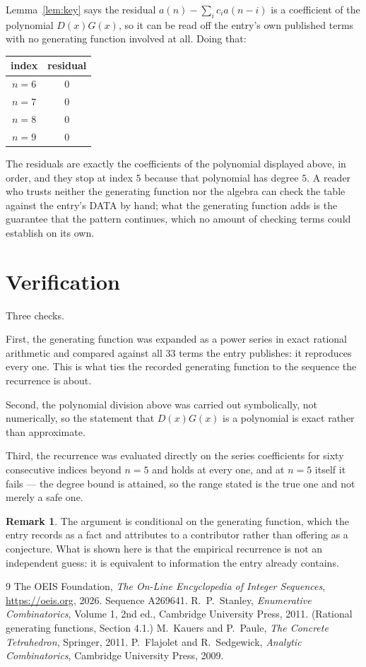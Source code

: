 \documentclass[11pt,a4paper]{article}
\theoremstyle{plain}
\theoremstyle{definition}
\newtheorem{remark}[theorem]{Remark}
\begin{document}
Lemma~\ref{lem:key} says the residual $a(n)-\sum_ic_ia(n-i)$ is a coefficient of the
polynomial $D(x)G(x)$, so it can be read off the entry's own published terms with no
generating function involved at all. Doing that:
\begin{center}
\begin{tabular}{cc}
index & residual \\ \hline
$n=6$ & $0$ \\
$n=7$ & $0$ \\
$n=8$ & $0$ \\
$n=9$ & $0$
\end{tabular}
\end{center}
The residuals are exactly the coefficients of the polynomial displayed above, in order, and
they stop at index $5$ because that polynomial has degree $5$. A reader who trusts
neither the generating function nor the algebra can check the table against the entry's DATA
by hand; what the generating function adds is the guarantee that the pattern continues, which
no amount of checking terms could establish on its own.

\section{Verification}

Three checks.

First, the generating function was expanded as a power series in exact rational arithmetic and
compared against all $33$ terms the entry publishes: it reproduces every one. This is
what ties the recorded generating function to the sequence the recurrence is about.

Second, the polynomial division above was carried out symbolically, not numerically, so the
statement that $D(x)G(x)$ is a polynomial is exact rather than approximate.

Third, the recurrence was evaluated directly on the series coefficients for sixty consecutive
indices beyond $n=5$ and holds at every one, and at $n=5$ itself it fails --- the
degree bound is attained, so the range stated is the true one and not merely a safe one.

\begin{remark}
The argument is conditional on the generating function, which the entry records as a fact and
attributes to a contributor rather than offering as a conjecture. What is shown here is that
the empirical recurrence is not an independent guess: it is equivalent to information the
entry already contains.
\end{remark}

\begin{thebibliography}{9}
 The OEIS Foundation, \emph{The On-Line Encyclopedia of Integer
Sequences}, \url{https://oeis.org}, 2026. Sequence A269641.
 R.~P.~Stanley, \emph{Enumerative Combinatorics}, Volume 1, 2nd ed.,
Cambridge University Press, 2011. (Rational generating functions, Section 4.1.)
 M.~Kauers and P.~Paule, \emph{The Concrete Tetrahedron}, Springer, 2011.
 P.~Flajolet and R.~Sedgewick, \emph{Analytic Combinatorics}, Cambridge
University Press, 2009.
\end{thebibliography}
\end{document}
